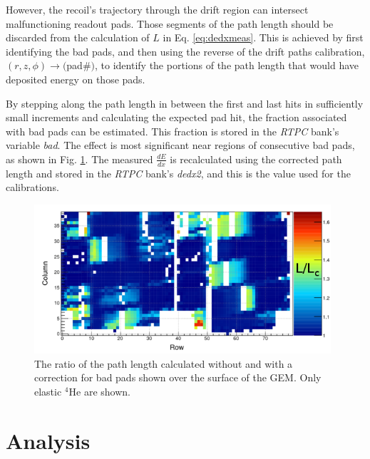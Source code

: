 \documentclass[amsmath,amssymb,notitlepage,12pt]{revtex4-1}
\begin{document}
However, the recoil's trajectory through the drift region can intersect malfunctioning readout pads.  Those segments of the path length should be discarded from the calculation of $L$ in Eq. \ref{eq:dedxmeas}. This is achieved by first identifying the bad pads, and then using the reverse of the drift paths calibration, $(r,z,\phi)\rightarrow($pad\#$)$, to identify the portions of the path length that would have deposited energy on those pads.

By stepping along the path length in between the first and last hits in sufficiently small increments and calculating the expected pad hit, the fraction associated with bad pads can be estimated.
This fraction is stored in the {\it RTPC} bank's variable {\it bad}.  The effect is most significant near regions of consecutive bad pads, as shown in Fig. \ref{fig:badpad}.
The measured $\frac{dE}{dx}$ is recalculated using the corrected path length and stored in the {\it RTPC} bank's {\it dedx2}, and this is the value used for the calibrations.
\begin{figure}[htbp]\centering
    \includegraphics[width=11cm]{DedxBPCratio_small2.png}
    \caption{The ratio of the path length calculated without and with a correction for bad pads shown over the surface of the GEM.  Only elastic $^4$He are shown.\label{fig:badpad}}
\end{figure}

\section{Analysis}
\end{document}

